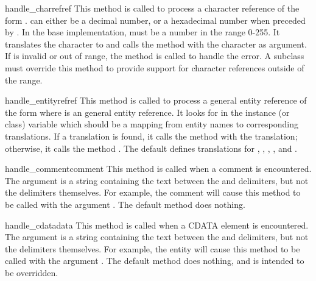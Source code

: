 \begin{funcdesc}{handle_charref}{ref}
This method is called to process a character reference of the form
.   can either be a decimal number,
or a hexadecimal number when preceded by .
In the base implementation,  must be a number in the
range 0-255.  It translates the character to \ASCII{} and calls the
method  with the character as argument.  If
 is invalid or out of range, the method
 is called to handle the error.  A
subclass must override this method to provide support for character
references outside of the \ASCII{} range.
\end{funcdesc}

\begin{funcdesc}{handle_entityref}{ref}
This method is called to process a general entity reference of the
form  where  is an general entity
reference.  It looks for  in the instance (or class)
variable  which should be a mapping from entity
names to corresponding translations.
If a translation is found, it calls the method 
with the translation; otherwise, it calls the method
.  The default 
defines translations for , , ,
, and .
\end{funcdesc}

\begin{funcdesc}{handle_comment}{comment}
This method is called when a comment is encountered.  The
 argument is a string containing the text between the
\samp{<!--} and \samp{-->} delimiters, but not the delimiters
themselves.  For example, the comment  will
cause this method to be called with the argument .  The
default method does nothing.
\end{funcdesc}

\begin{funcdesc}{handle_cdata}{data}
This method is called when a CDATA element is encountered.  The
 argument is a string containing the text between the
\samp{<![CDATA[} and \samp{]]>} delimiters, but not the delimiters
themselves.  For example, the entity \samp{<![CDATA[text]]>} will
cause this method to be called with the argument .  The
default method does nothing, and is intended to be overridden.
\end{funcdesc}

